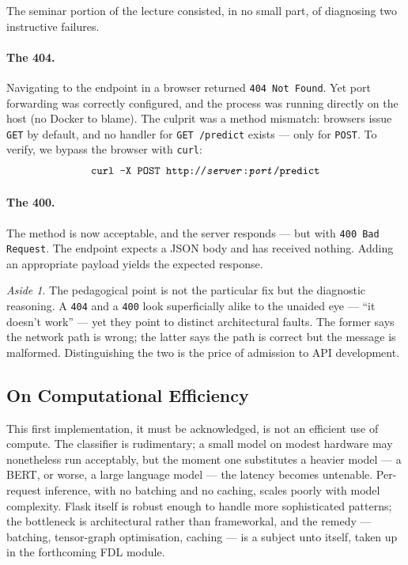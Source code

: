\documentclass[11pt,a4paper]{article}
\theoremstyle{definition}
\theoremstyle{remark}
\newtheorem*{aside}{Aside}
\begin{document}
The seminar portion of the lecture consisted, in no small part, of diagnosing two instructive failures.

\paragraph{The 404.}
Navigating to the endpoint in a browser returned \texttt{404 Not Found}. Yet port forwarding was correctly configured, and the process was running directly on the host (no Docker to blame). The culprit was a method mismatch: browsers issue \texttt{GET} by default, and no handler for \texttt{GET /predict} exists --- only for \texttt{POST}. To verify, we bypass the browser with \texttt{curl}:
\begin{equation*}
\texttt{curl -X POST http://\textit{server}:\textit{port}/predict}
\end{equation*}

\paragraph{The 400.}
The method is now acceptable, and the server responds --- but with \texttt{400 Bad Request}. The endpoint expects a JSON body and has received nothing. Adding an appropriate payload yields the expected response.

\begin{aside}
The pedagogical point is not the particular fix but the diagnostic reasoning. A \texttt{404} and a \texttt{400} look superficially alike to the unaided eye --- ``it doesn't work'' --- yet they point to distinct architectural faults. The former says the network path is wrong; the latter says the path is correct but the message is malformed. Distinguishing the two is the price of admission to API development.
\end{aside}

\subsection{On Computational Efficiency}

This first implementation, it must be acknowledged, is not an efficient use of compute. The classifier is rudimentary; a small model on modest hardware may nonetheless run acceptably, but the moment one substitutes a heavier model --- a BERT, or worse, a large language model --- the latency becomes untenable. Per-request inference, with no batching and no caching, scales poorly with model complexity. Flask itself is robust enough to handle more sophisticated patterns; the bottleneck is architectural rather than frameworkal, and the remedy --- batching, tensor-graph optimisation, caching --- is a subject unto itself, taken up in the forthcoming FDL module.
\end{document}
